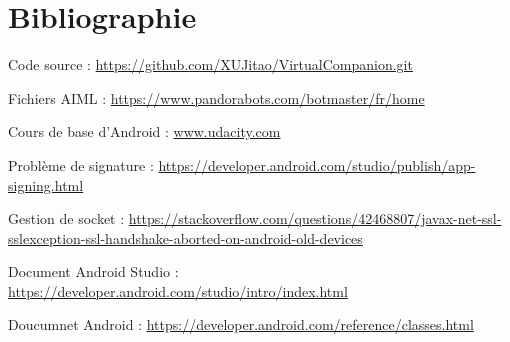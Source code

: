 \section*{Bibliographie}

Code source : \url{https://github.com/XUJitao/VirtualCompanion.git}

Fichiers AIML : \url{https://www.pandorabots.com/botmaster/fr/home}

Cours de base d'Android : \url{www.udacity.com}

Problème de signature : \url{https://developer.android.com/studio/publish/app-signing.html}

Gestion de socket : \url{https://stackoverflow.com/questions/42468807/javax-net-ssl-sslexception-ssl-handshake-aborted-on-android-old-devices}

Document Android Studio : \url{https://developer.android.com/studio/intro/index.html}

Doucumnet Android : \url{https://developer.android.com/reference/classes.html}

\newpage

